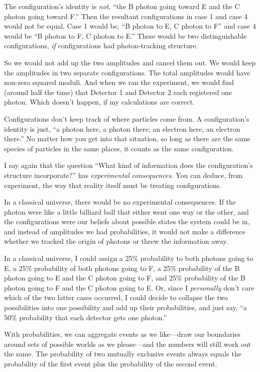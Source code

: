{
 The configuration's identity is \textit{not},
``the B photon going toward E and the C photon going
toward F.'' Then the resultant configurations in case
1 and case 4 would not be equal. Case 1 would be, ``B
photon to E, C photon to F'' and case 4 would be
``B photon to F, C photon to E.''
These would be two distinguishable configurations, \textit{if}
configurations had photon-tracking structure.}

{
 So we would not add up the two amplitudes and cancel them out. We
would keep the amplitudes in two separate configurations. The total
amplitudes would have non-zero squared moduli. And when we ran the
experiment, we would find (around half the time) that Detector 1 and
Detector 2 each registered one photon. Which doesn't
happen, if my calculations are correct.}

{
 Configurations don't keep track of where particles
come from. A configuration's identity is just,
``a photon here, a photon there; an electron here, an
electron there.'' No matter how you get into that
situation, so long as there are the same species of particles in the
same places, it counts as the same configuration.}

{
 I say again that the question ``What kind of
information does the configuration's structure
incorporate?'' has \textit{experimental
consequences.} You can deduce, from experiment, the way that reality
itself must be treating configurations.}

{
 In a classical universe, there would be no experimental
consequences. If the photon were like a little billiard ball that
either went one way or the other, and the configurations were our
beliefs about possible states the system could be in, and instead of
amplitudes we had probabilities, it would not make a difference whether
we tracked the origin of photons or threw the information away.}

{
 In a classical universe, I could assign a 25\% probability to both
photons going to E, a 25\% probability of both photons going to F, a
25\% probability of the B photon going to E and the C photon going to
F, and 25\% probability of the B photon going to F and the C photon
going to E. Or, since I \textit{personally} don't care
which of the two latter cases occurred, I could decide to collapse the
two possibilities into one possibility and add up their probabilities,
and just say, ``a 50\% probability that each detector
gets one photon.''}

{
 With probabilities, we can aggregate events as we like---draw our
boundaries around sets of possible worlds as we please---and the
numbers will still work out the same. The probability of two mutually
exclusive events always equals the probability of the first event plus
the probability of the second event.}

